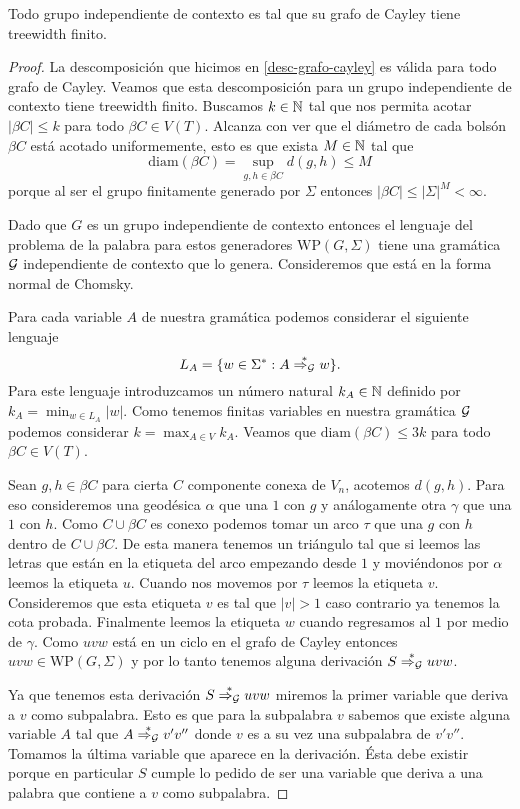 \documentclass[tesis.tex]{subfiles}
\newcommand{\WP}{\text{WP}(G, \Sigma)}
\newcommand{\deriva}{\overset{*}{\Rightarrow_{\cal G}}}
\begin{document}
\begin{teo}
	Todo grupo independiente de contexto es tal que su grafo de Cayley tiene treewidth finito.
\end{teo}
\begin{proof}

La descomposición que hicimos en \ref{desc-grafo-cayley} es válida para todo grafo de Cayley. 
Veamos que esta descomposición para un grupo independiente de contexto tiene treewidth finito. 
Buscamos $k \in \mathbb N$ tal que nos permita acotar $|\beta C| \le k$ para todo $\beta C \in V(T)$. 
Alcanza con ver que el diámetro de cada bolsón $\beta C$ está acotado uniformemente, esto es que exista $M \in \mathbb N$ tal que 
\[
\text{diam}(\beta C) =  \sup_{g,h \in \beta C} d(g,h) \le M
\] 
porque al ser el grupo finitamente generado por $\Sigma$ entonces $|\beta C| \le |\Sigma|^{M} < \infty$. 


Dado que $G$ es un grupo independiente de contexto entonces el lenguaje del problema de la palabra para estos generadores $\WP$ tiene una gramática $\cal G$ independiente de contexto que lo genera. 
Consideremos que está en la forma normal de Chomsky.

Para cada variable $A$ de nuestra gramática podemos considerar el siguiente lenguaje
\[
L_A = \{ w \in \Sigma^* : A \deriva w  \}.
\]
Para este lenguaje introduzcamos un número natural $k_A \in \mathbb N$ definido por $k_A = \min_{w \in L_A} |w|$. 
Como tenemos finitas variables en nuestra gramática $\cal G$ podemos considerar $k = \max_{A \in V} k_A$. 
Veamos que $\text{diam}(\beta C) \le 3k$ para todo $\beta C \in V(T)$.

Sean $g,h \in \beta C$ para cierta $C$ componente conexa de $V_n$, acotemos $d(g,h)$. 
Para eso consideremos una geodésica $\alpha$ que una $1$ con $g$ y análogamente otra $\gamma$ que una $1$ con $h$. 
Como $C \cup \beta C$ es conexo podemos tomar un arco $\tau$ que una $g$ con  $h$ dentro de $C \cup \beta C$. 
De esta manera tenemos un triángulo tal que si leemos las letras que están en la etiqueta del arco empezando desde $1$ y moviéndonos por $\alpha$ leemos la etiqueta $u$. 
Cuando nos movemos por $\tau$ leemos la etiqueta $v$. Consideremos que esta etiqueta $v$ es tal que $|v|>1$ caso contrario ya tenemos la cota probada. Finalmente leemos la etiqueta $w$ cuando regresamos al $1$ por medio de $\gamma$.
Como $uvw$ está en un ciclo en el grafo de Cayley entonces $uvw \in  \WP$ y por lo tanto tenemos alguna derivación $S \deriva uvw$.

Ya que tenemos esta derivación $S \deriva uvw$ miremos la primer variable que deriva a $v$ como subpalabra. 
Esto es que para la subpalabra $v$ sabemos que existe alguna variable $A$ tal que $A \deriva v'v''$ donde $v$ es a su vez una subpalabra de $v'v''$. 
Tomamos la última variable que aparece en la derivación.
Ésta debe existir porque en particular $S$ cumple lo pedido de ser una variable que deriva a una palabra que contiene a $v$ como subpalabra.


\end{proof}
\end{document}
